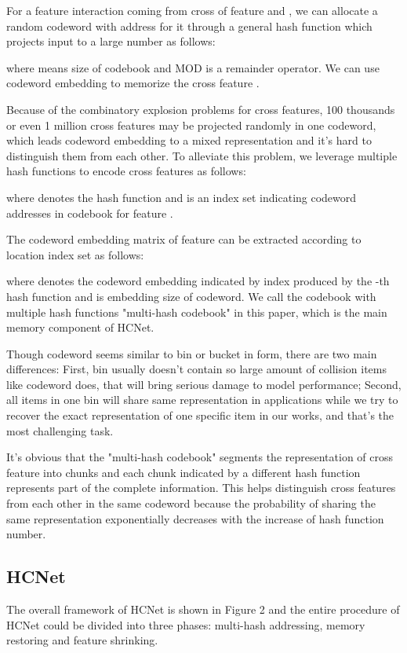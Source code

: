 \documentclass[sigconf,authorversion]{acmart}
\begin{document}
For a feature interaction  coming from cross of feature  and , we can allocate a random codeword with address  for it through a general hash function  which projects input to a large number as follows:

where  means size of codebook and MOD is a remainder operator. We can use codeword embedding to memorize the cross feature .

Because of the combinatory explosion problems for cross features, 100 thousands or even 1 million cross features may be projected randomly in one codeword, which leads codeword embedding to a mixed representation and it's hard to distinguish them from each other. To alleviate this problem, we leverage multiple hash functions to encode cross features as follows:

where  denotes the  hash function and  is an index set indicating  codeword addresses in codebook for feature .

The codeword embedding matrix  of feature  can be extracted according to location index set  as follows:
 
where  denotes the codeword embedding indicated by index produced by the -th hash function  and  is embedding size of codeword. We call the codebook with multiple hash functions "multi-hash codebook" in this paper, which is the main memory component of HCNet.

Though codeword seems similar to bin or bucket\cite{bins} in form, there are two main differences: First, bin usually doesn't  contain  so large amount of collision items like codeword does, that will bring serious damage to model performance; Second, all items in one bin will share same representation in applications while we try to recover the exact representation of one specific item in our works, and that's the most challenging task.

It's obvious that the "multi-hash codebook" segments the representation of cross feature into   chunks and each chunk indicated by a different hash function represents part of the complete information. This helps distinguish cross features from each other in the same codeword because the probability of sharing the same representation exponentially decreases with the increase of hash function number.
\subsection{HCNet}
The overall framework of HCNet is shown in Figure 2 and the entire procedure of HCNet could be divided into three phases: multi-hash addressing, memory restoring and feature shrinking.  
\end{document}
